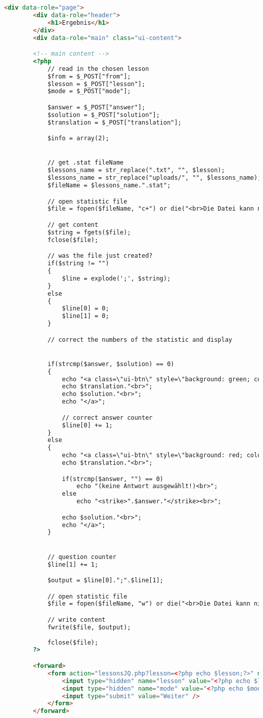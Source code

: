 \documentclass{scrartcl}
\begin{document}
\begin{itemize}
\begin{lstlisting}[language=html]
		<div data-role="page">
		<div data-role="header">
			<h1>Ergebnis</h1>
		</div>
		<div data-role="main" class="ui-content">

		<!-- main content -->
		<?php
			// read in the chosen lesson
			$from = $_POST["from"];
			$lesson = $_POST["lesson"];
			$mode = $_POST["mode"];

			$answer = $_POST["answer"];
			$solution = $_POST["solution"];
			$translation = $_POST["translation"];

			$info = array(2);


			// get .stat fileName
			$lessons_name = str_replace(".txt", "", $lesson);
			$lessons_name = str_replace("uploads/", "", $lessons_name);
			$fileName = $lessons_name.".stat";

			// open statistic file
			$file = fopen($fileName, "c+") or die("<br>Die Datei kann nicht geöffnet werden!");

			// get content
			$string = fgets($file);
			fclose($file);	

			// was the file just created?
			if($string != "")
			{
				$line = explode(';', $string);
			}
			else
			{
				$line[0] = 0;
				$line[1] = 0;
			}

			// correct the numbers of the statistic and display


			if(strcmp($answer, $solution) == 0)
			{
				echo "<a class=\"ui-btn\" style=\"background: green; color: white;\">";
				echo $translation."<br>";
				echo $solution."<br>";
				echo "</a>";

				// correct answer counter
				$line[0] += 1;
			}
			else
			{
				echo "<a class=\"ui-btn\" style=\"background: red; color: white;\";>";
				echo $translation."<br>";

				if(strcmp($answer, "") == 0)
					echo "(keine Antwort ausgewählt!)<br>";
				else
					echo "<strike>".$answer."</strike><br>";

				echo $solution."<br>";
				echo "</a>";
			}


			// question counter
			$line[1] += 1;

			$output = $line[0].";".$line[1];

			// open statistic file	
			$file = fopen($fileName, "w") or die("<br>Die Datei kann nicht zum schreiben geöffnet werden!");

			// write content
			fwrite($file, $output);
	
			fclose($file);
		?>

		<forward>
			<form action="lessonsJQ.php?lesson=<?php echo $lesson;?>" method="POST">
				<input type="hidden" name="lesson" value="<?php echo $lesson;?>" />
				<input type="hidden" name="mode" value="<?php echo $mode;?>" />
				<input type="submit" value="Weiter" />
			</form>
		</forward>


\end{lstlisting}
\end{itemize}
\end{document}
